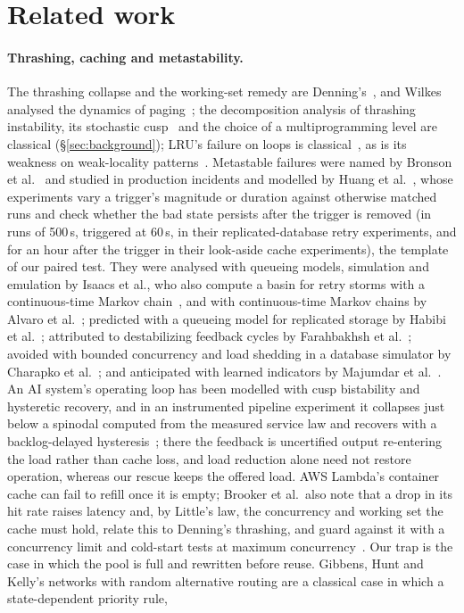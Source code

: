 \section{Related work}\label{sec:related}

\paragraph{Thrashing, caching and metastability.} The thrashing collapse and the working-set remedy are Denning's~\citep{denning1968thrashing,denning1968working}, and Wilkes analysed the dynamics of paging~\citep{wilkes1973dynamics}; the decomposition analysis of thrashing instability, its stochastic cusp~\citep{nelson1987stochastic,yokohira1989catastrophic} and the choice of a multiprogramming level are classical (\S\ref{sec:background}); LRU's failure on loops is classical~\citep{chou1985evaluation,smaragdakis1999eelru}, as is its weakness on weak-locality patterns~\citep{jiang2002lirs}. Metastable failures were named by Bronson et al.~\citep{bronson2021metastable} and studied in production incidents and modelled by Huang et al.~\citep{huang2022metastable}, whose experiments vary a trigger's magnitude or duration against otherwise matched runs and check whether the bad state persists after the trigger is removed (in runs of 500\,s, triggered at 60\,s, in their replicated-database retry experiments, and for an hour after the trigger in their look-aside cache experiments), the template of our paired test. They were analysed with queueing models, simulation and emulation by Isaacs et al., who also compute a basin for retry storms with a continuous-time Markov chain~\citep{isaacs2025analyzing}, and with continuous-time Markov chains by Alvaro et al.~\citep{alvaro2025formal}; predicted with a queueing model for replicated storage by Habibi et al.~\citep{habibi2024msf}; attributed to destabilizing feedback cycles by Farahbakhsh et al.~\citep{farahbakhsh2025modeling,farahbakhsh2026characterizing}; avoided with bounded concurrency and load shedding in a database simulator by Charapko et al.~\citep{charapko2026execution}; and anticipated with learned indicators by Majumdar et al.~\citep{majumdar2026learning}. An AI system's operating loop has been modelled with cusp bistability and hysteretic recovery, and in an instrumented pipeline experiment it collapses just below a spinodal computed from the measured service law and recovers with a backlog-delayed hysteresis~\citep{vanrooyen2026recoverability}; there the feedback is uncertified output re-entering the load rather than cache loss, and load reduction alone need not restore operation, whereas our rescue keeps the offered load. AWS Lambda's container cache can fail to refill once it is empty; Brooker et al.\ also note that a drop in its hit rate raises latency and, by Little's law, the concurrency and working set the cache must hold, relate this to Denning's thrashing, and guard against it with a concurrency limit and cold-start tests at maximum concurrency~\citep{brooker2023ondemand}. Our trap is the case in which the pool is full and rewritten before reuse. Gibbens, Hunt and Kelly's networks with random alternative routing are a classical case in which a state-dependent priority rule, 